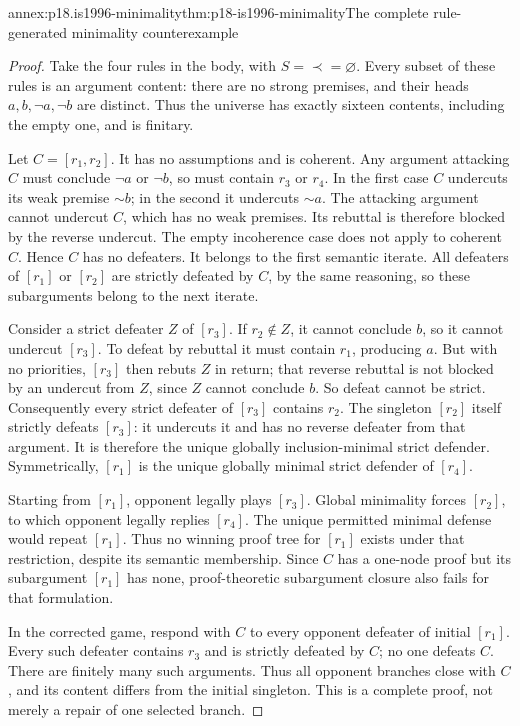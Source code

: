\begin{annexitem}{annex:p18.is1996-minimality}{thm:p18-is1996-minimality}{The complete rule-generated minimality counterexample}
\begin{proof}
Take the four rules in the body, with \(S=\prec=\varnothing\).
Every subset of these rules is an argument content: there
are no strong premises, and their heads \(a,b,\neg a,\neg b\)
are distinct. Thus the universe has exactly sixteen contents,
including the empty one, and is finitary.

Let \(C=[r_1,r_2]\).
It has no assumptions and is coherent.
Any argument attacking \(C\) must conclude \(\neg a\) or
\(\neg b\), so must contain \(r_3\) or \(r_4\).
In the first case \(C\) undercuts its weak premise
\(\mathord{\sim}b\); in the second it undercuts
\(\mathord{\sim}a\).
The attacking argument cannot undercut \(C\), which has
no weak premises. Its rebuttal is therefore blocked by
the reverse undercut. The empty incoherence case does
not apply to coherent \(C\). Hence \(C\) has no defeaters.
It belongs to the first semantic iterate.
All defeaters of \([r_1]\) or \([r_2]\) are strictly
defeated by \(C\), by the same reasoning, so these
subarguments belong to the next iterate.

Consider a strict defeater \(Z\) of \([r_3]\).
If \(r_2\notin Z\), it cannot conclude \(b\), so it cannot
undercut \([r_3]\).
To defeat by rebuttal it must contain \(r_1\), producing \(a\).
But with no priorities, \([r_3]\) then rebuts \(Z\) in return;
that reverse rebuttal is not blocked by an undercut from \(Z\),
since \(Z\) cannot conclude \(b\).
So defeat cannot be strict.
Consequently every strict defeater of \([r_3]\) contains \(r_2\).
The singleton \([r_2]\) itself strictly defeats \([r_3]\):
it undercuts it and has no reverse defeater from that argument.
It is therefore the unique globally inclusion-minimal strict defender.
Symmetrically, \([r_1]\) is the unique globally minimal
strict defender of \([r_4]\).

Starting from \([r_1]\), opponent legally plays \([r_3]\).
Global minimality forces \([r_2]\), to which opponent
legally replies \([r_4]\).
The unique permitted minimal defense would repeat \([r_1]\).
Thus no winning proof tree for \([r_1]\) exists under
that restriction, despite its semantic membership.
Since \(C\) has a one-node proof but its subargument
\([r_1]\) has none, proof-theoretic subargument closure
also fails for that formulation.

In the corrected game, respond with \(C\) to every opponent
defeater of initial \([r_1]\).
Every such defeater contains \(r_3\) and is strictly defeated
by \(C\); no one defeats \(C\).
There are finitely many such arguments.
Thus all opponent branches close with \(C\), and its content
differs from the initial singleton. This is a complete proof,
not merely a repair of one selected branch.
\end{proof}
\end{annexitem}

